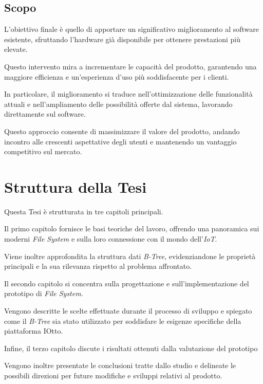 \documentclass[12pt,a4paper,openright,twoside]{book}
\begin{document}
        \subsection{Scopo}

            L’obiettivo finale è quello di apportare un significativo miglioramento al software esistente, sfruttando l’hardware già disponibile per ottenere prestazioni più elevate.

            Questo intervento mira a incrementare le capacità del prodotto, garantendo una maggiore efficienza e un’esperienza d’uso più soddisfacente per i clienti.

            In particolare, il miglioramento si traduce nell’ottimizzazione delle funzionalità attuali e nell’ampliamento delle possibilità offerte dal sistema, lavorando direttamente sul software.

            Questo approccio consente di massimizzare il valore del prodotto, andando incontro alle crescenti aspettative degli utenti e mantenendo un vantaggio competitivo sul mercato.

    \section{Struttura della Tesi}

        Questa Tesi è strutturata in tre capitoli principali.

        Il primo capitolo fornisce le basi teoriche del lavoro, offrendo una panoramica sui moderni \textit{File System} e sulla loro connessione con il mondo dell’\textit{IoT}.

        Viene inoltre approfondita la struttura dati \textit{B-Tree}, evidenziandone le proprietà principali e la sua rilevanza rispetto al problema affrontato.

        Il secondo capitolo si concentra sulla progettazione e sull’implementazione del prototipo di \textit{File System}.

        Vengono descritte le scelte effettuate durante il processo di sviluppo e spiegato come il \textit{B-Tree} sia stato utilizzato per soddisfare le esigenze specifiche della piattaforma IOtto.

        Infine, il terzo capitolo discute i risultati ottenuti dalla valutazione del prototipo

        Vengono inoltre presentate le conclusioni tratte dallo studio e delineate le possibili direzioni per future modifiche e sviluppi relativi al prodotto.
\end{document}
